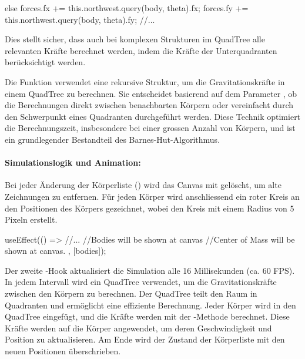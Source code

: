 \documentclass[a4paper,12pt,twoside]{article}
\begin{document}
\begin{javascript}
else {
    forces.fx += this.northwest.query(body, theta).fx;
    forces.fy += this.northwest.query(body, theta).fy;
    //...
}
\end{javascript}

Dies stellt sicher, dass auch bei komplexen Strukturen im QuadTree alle relevanten 
Kräfte berechnet werden, indem die Kräfte der Unterquadranten berücksichtigt werden.

Die Funktion  verwendet eine rekursive Struktur, 
um die Gravitationskräfte in einem QuadTree zu berechnen. Sie entscheidet basierend 
auf dem Parameter , ob die Berechnungen direkt zwischen 
benachbarten Körpern oder vereinfacht durch den Schwerpunkt eines Quadranten 
durchgeführt werden. Diese Technik optimiert die Berechnungszeit, insbesondere 
bei einer grossen Anzahl von Körpern, und ist ein grundlegender Bestandteil des 
Barnes-Hut-Algorithmus.


\paragraph{Simulationslogik und Animation:}

Bei jeder Änderung der Körperliste () wird das 
Canvas mit  gelöscht, um alte Zeichnungen zu 
entfernen. Für jeden Körper wird anschliessend ein roter Kreis an den Positionen 
des Körpers gezeichnet, wobei  den Kreis mit einem 
Radius von 5 Pixeln erstellt.

\begin{javascript}
    useEffect(() => {
        //...
        //Bodies will be shown at canvas
        //Center of Mass will be shown at canvas.
    }, [bodies]);

\end{javascript}


Der zweite -Hook aktualisiert die Simulation alle 
16 Millisekunden (ca. 60 FPS). In jedem Intervall wird ein QuadTree verwendet, 
um die Gravitationskräfte zwischen den Körpern zu berechnen. Der QuadTree teilt 
den Raum in Quadranten und ermöglicht eine effiziente Berechnung. Jeder Körper 
wird in den QuadTree eingefügt, und die Kräfte werden mit der 
-Methode berechnet. Diese Kräfte werden auf die Körper 
angewendet, um deren Geschwindigkeit und Position zu aktualisieren. 
Am Ende wird der Zustand der Körperliste mit den neuen Positionen überschrieben.
\end{document}
